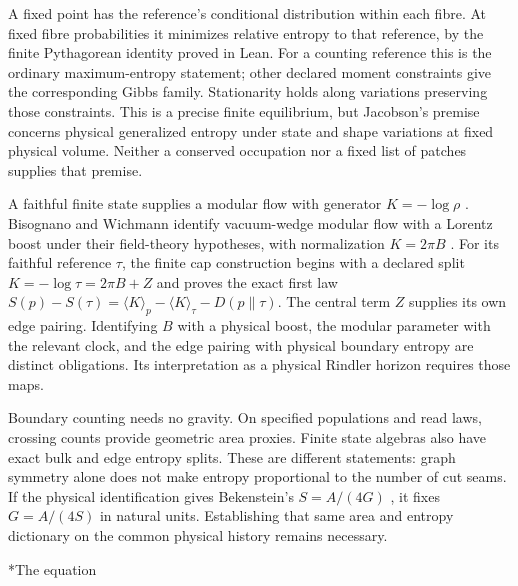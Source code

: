 \documentclass[12pt]{article}
\makeatletter
\renewcommand\section{\@startsection{section}{1}{\z@}{-1.4ex plus -0.4ex minus -0.2ex}{0.7ex plus 0.1ex}{\normalfont\large\bfseries}}
\makeatother
\begin{document}
\begin{doublespace}
A fixed point has the reference's conditional distribution within each fibre. At fixed fibre probabilities it minimizes relative entropy to that reference, by the finite Pythagorean identity proved in Lean. For a counting reference this is the ordinary maximum-entropy statement; other declared moment constraints give the corresponding Gibbs family. Stationarity holds along variations preserving those constraints. This is a precise finite equilibrium, but Jacobson's premise concerns physical generalized entropy under state and shape variations at fixed physical volume. Neither a conserved occupation nor a fixed list of patches supplies that premise.

A faithful finite state supplies a modular flow with generator $K=-\log\rho$ \cite{takesaki1970}. Bisognano and Wichmann identify vacuum-wedge modular flow with a Lorentz boost under their field-theory hypotheses, with normalization $K=2\pi B$ \cite{bw76}. For its faithful reference $\tau$, the finite cap construction begins with a declared split $K=-\log\tau=2\pi B+Z$ and proves the exact first law $S(p)-S(\tau)=\langle K\rangle_p-\langle K\rangle_\tau-D(p\|\tau)$. The central term $Z$ supplies its own edge pairing. Identifying $B$ with a physical boost, the modular parameter with the relevant clock, and the edge pairing with physical boundary entropy are distinct obligations. Its interpretation as a physical Rindler horizon requires those maps.

Boundary counting needs no gravity. On specified populations and read laws, crossing counts provide geometric area proxies. Finite state algebras also have exact bulk and edge entropy splits. These are different statements: graph symmetry alone does not make entropy proportional to the number of cut seams. If the physical identification gives Bekenstein's $S=A/(4G)$ \cite{bekenstein1973}, it fixes $G=A/(4S)$ in natural units. Establishing that same area and entropy dictionary on the common physical history remains necessary.

\section*{The equation}


\end{doublespace}
\end{document}
